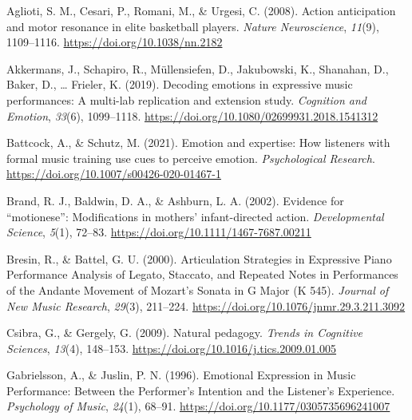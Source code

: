 \documentclass[
  man,floatsintext]{apa6}
\newlength{\cslhangindent}
\newlength{\cslentryspacingunit} %
\newenvironment{CSLReferences}[2] %
 {%
  \setlength{\parindent}{0pt}
  \ifodd #1
  \let\oldpar\par
  \def\par{\hangindent=\cslhangindent\oldpar}
  \fi
  \setlength{\parskip}{#2\cslentryspacingunit}
 }%
 {}
\begin{document}
\begingroup
\setlength{\parindent}{-0in}
\setlength{\leftskip}{0in}

\hypertarget{refs}{}
\begin{CSLReferences}{1}{0}
\leavevmode{}%
Aglioti, S. M., Cesari, P., Romani, M., \& Urgesi, C. (2008). Action anticipation and motor resonance in elite basketball players. \emph{Nature Neuroscience}, \emph{11}(9), 1109--1116. \url{https://doi.org/10.1038/nn.2182}

\leavevmode{}%
Akkermans, J., Schapiro, R., Müllensiefen, D., Jakubowski, K., Shanahan, D., Baker, D., \ldots{} Frieler, K. (2019). Decoding emotions in expressive music performances: {A} multi-lab replication and extension study. \emph{Cognition and Emotion}, \emph{33}(6), 1099--1118. \url{https://doi.org/10.1080/02699931.2018.1541312}

\leavevmode{}%
Battcock, A., \& Schutz, M. (2021). Emotion and expertise: How listeners with formal music training use cues to perceive emotion. \emph{Psychological Research}. \url{https://doi.org/10.1007/s00426-020-01467-1}

\leavevmode{}%
Brand, R. J., Baldwin, D. A., \& Ashburn, L. A. (2002). Evidence for {``motionese''}: Modifications in mothers' infant-directed action. \emph{Developmental Science}, \emph{5}(1), 72--83. \url{https://doi.org/10.1111/1467-7687.00211}

\leavevmode{}%
Bresin, R., \& Battel, G. U. (2000). Articulation {Strategies} in {Expressive Piano Performance Analysis} of {Legato}, {Staccato}, and {Repeated Notes} in {Performances} of the {Andante Movement} of {Mozart}'s {Sonata} in {G Major} ({K} 545). \emph{Journal of New Music Research}, \emph{29}(3), 211--224. \url{https://doi.org/10.1076/jnmr.29.3.211.3092}

\leavevmode{}%
Csibra, G., \& Gergely, G. (2009). Natural pedagogy. \emph{Trends in Cognitive Sciences}, \emph{13}(4), 148--153. \url{https://doi.org/10.1016/j.tics.2009.01.005}

\leavevmode{}%
Gabrielsson, A., \& Juslin, P. N. (1996). Emotional {Expression} in {Music Performance}: {Between} the {Performer}'s {Intention} and the {Listener}'s {Experience}. \emph{Psychology of Music}, \emph{24}(1), 68--91. \url{https://doi.org/10.1177/0305735696241007}


\end{CSLReferences}
\end{document}
